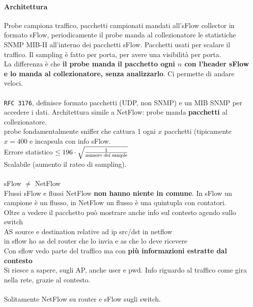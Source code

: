 \documentclass[10pt]{book}
\begin{document}
\paragraph{Architettura} Probe campiona traffico, pacchetti campionati mandati all'sFlow collector in formato sFlow, periodicamente il probe manda al collezionatore le statistiche SNMP MIB-II all'interno dei pacchetti sFlow. Pacchetti usati per scalare il traffico. Il sampling è fatto per porta, per avere una visibilità per porta.\\
La differenza è che \textbf{il probe manda il pacchetto ogni $n$ con l'header sFlow e lo manda al collezionatore, senza analizzarlo}. Ci permette di andare veloci.\\\\
\texttt{RFC 3176}, definisce formato pacchetti (UDP, non SNMP) e un MIB SNMP per accedere i dati. Architettura simile a NetFlow: probe manda \textbf{pacchetti} al collezionatore.\\
probe fondamentalmente sniffer che cattura 1 ogni $x$ pacchetti (tipicamente $x = 400$ e incapsula con info sFlow.\\
Errore statistico $\leq 196\cdot\sqrt{\frac{1}{\textsl{numero dei sample}}}$\\
Scalabile (aumento il rateo di sampling).\\\\
sFlow $\neq$ NetFlow\\
Flussi sFlow e flussi NetFlow \textbf{non hanno niente in comune}. In sFlow un campione è un flusso, in NetFlow un flusso è una quintupla con contatori.\\
Oltre a vedere il pacchetto può mostrare anche info sul contesto agendo sullo switch\\
AS source e destination relative ad ip src/dst in netflow\\
in sflow ho as del router che lo invia e as che lo deve ricevere\\
Con sflow vedo parte del traffico ma con \textbf{più informazioni estratte dal contesto}\\
Si riesce a sapere, sugli AP, anche user e pwd. Info riguardo al traffico come gira nella rete, grazie al contesto.\\\\
Solitamente NetFlow su router e sFlow sugli switch.
\end{document}
